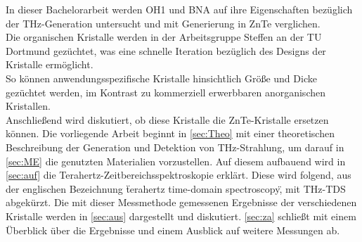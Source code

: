 In dieser Bachelorarbeit werden OH1 und BNA auf ihre Eigenschaften bezüglich der THz-Generation untersucht und mit 
Generierung in ZnTe verglichen. \\
Die organischen Kristalle werden in der Arbeitsgruppe Steffen an der TU Dortmund gezüchtet, 
was eine schnelle Iteration bezüglich des Designs der Kristalle ermöglicht.  \\
So können anwendungsspezifische Kristalle hinsichtlich Größe und Dicke gezüchtet werden, 
im Kontrast zu kommerziell erwerbbaren anorganischen Kristallen. \\
Anschließend wird diskutiert, ob diese Kristalle die ZnTe-Kristalle ersetzen können. 
Die vorliegende Arbeit beginnt in \autoref{sec:Theo} mit einer theoretischen Beschreibung der Generation und Detektion von
THz-Strahlung, um darauf in \autoref{sec:ME} die genutzten Materialien vorzustellen.
Auf diesem aufbauend wird in \autoref{sec:auf} die Terahertz-Zeitbereichsspektroskopie erklärt. 
Diese wird folgend, aus der englischen Bezeichnung \"terahertz time-domain spectroscopy\", mit THz-TDS abgekürzt.
Die mit dieser Messmethode gemessenen Ergebnisse der verschiedenen Kristalle werden in \autoref{sec:aus} dargestellt und diskutiert.
\autoref{sec:za} schließt mit einem Überblick über die Ergebnisse und einem Ausblick auf weitere Messungen ab.